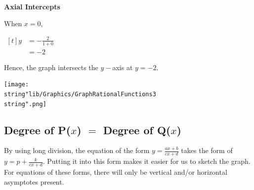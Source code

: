 \documentclass[11pt,a4paper]{book}
\begin{document}
\begin{example}{}
\textbf{Axial Intercepts}

When $x=0$,

$
\begin{aligned}[t]
y & =-\frac{2}{1+0}\\
 & =-2
\end{aligned}
$

Hence, the graph intersects the $y-$axis at $y=-2$.
\begin{center}
\texttt{[image: \\string"lib/Graphics/GraphRationalFunctions3\\string".png]}
\par\end{center}

\end{example}

\newpage

\subsection{Degree of P($x$) $=$ Degree of Q($x$) }

By using long division, the equation of the form ${\displaystyle y=\frac{ax+b}{cx+d}}$
takes the form of ${\displaystyle y=p+\frac{k}{cx+d}}$. Putting it
into this form makes it easier for us to sketch the graph. For equations
of these forms, there will only be vertical and/or horizontal asymptotes
present.
\end{document}
